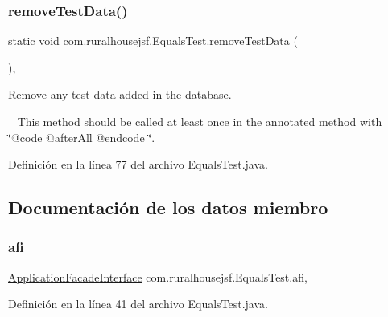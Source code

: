 \subsubsection{\texorpdfstring{removeTestData()}{removeTestData()}}
{\footnotesize\ttfamily static void com.\+ruralhousejsf.\+Equals\+Test.\+remove\+Test\+Data (\begin{DoxyParamCaption}{ }\end{DoxyParamCaption})\hspace{0.3cm}{\ttfamily [static]}, {\ttfamily [private]}}



Remove any test data added in the database. 

~\newline
 This method should be called at least once in the annotated method with \char`\"{}@code @after\+All @endcode \char`\"{}. 

Definición en la línea 77 del archivo Equals\+Test.\+java.



\subsection{Documentación de los datos miembro}
\mbox{\label{classcom_1_1ruralhousejsf_1_1_equals_test_a51e738cac64499dfd6d290d8f70ec8ce}} 
\subsubsection{\texorpdfstring{afi}{afi}}
{\footnotesize\ttfamily \mbox{\hyperlink{interfacecom_1_1ruralhousejsf_1_1business_logic_1_1_application_facade_interface}{Application\+Facade\+Interface}} com.\+ruralhousejsf.\+Equals\+Test.\+afi\hspace{0.3cm}{\ttfamily [static]}, {\ttfamily [package]}}



Definición en la línea 41 del archivo Equals\+Test.\+java.

\mbox{\label{classcom_1_1ruralhousejsf_1_1_equals_test_a313faa108d9cc5b97c40bf50af089c87}} 
